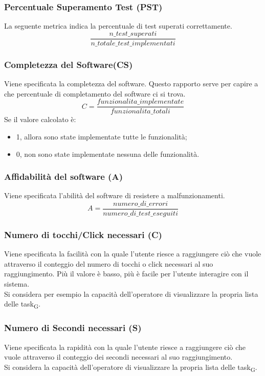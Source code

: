 \subsubsection{Percentuale Superamento Test (PST)}
La seguente metrica indica la percentuale di test superati correttamente.
\[\frac{n\_test\_superati}{n\_totale\_test\_implementati}\]

\subsubsection{Completezza del Software(CS)}
Viene specificata la completezza del software. Questo rapporto serve per capire a che percentuale di completamento del software ci si trova.
\[C = \frac{funzionalita\_implementate }{funzionalita\_totali}\]
Se il valore calcolato è:
\begin{itemize}
    \item 1, allora sono state implementate tutte le funzionalità;
    \item 0, non sono state implementate nessuna delle funzionalità.
\end{itemize}

\subsubsection{Affidabilità del software (A)}
Viene specificata l'abilità del software di resistere a malfunzionamenti.
\[A = \frac{numero\_di\_errori}{numero\_di\_test\_eseguiti}\]

\subsubsection{Numero di tocchi/Click necessari (C)}
Viene specificata la facilità con la quale l'utente riesce a raggiungere ciò che vuole attraverso il conteggio del numero di tocchi o click necessari al suo raggiungimento. Più il valore è basso, più è facile per l'utente interagire con il sistema.\\
Si considera per esempio la capacità dell'operatore di visualizzare la propria lista delle task\textsubscript{G}.

\subsubsection{Numero di Secondi necessari (S)}
Viene specificata la rapidità con la quale l'utente riesce a raggiungere ciò che vuole attraverso il conteggio dei secondi necessari al suo raggiungimento.\\
Si considera la capacità dell'operatore di visualizzare la propria lista delle task\textsubscript{G}.


